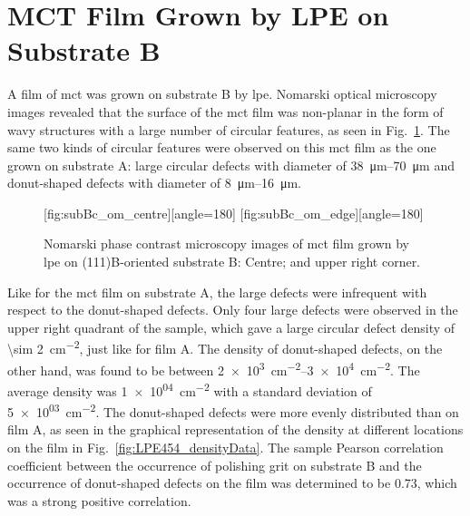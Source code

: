 \clearpage
\section{MCT Film Grown by LPE on Substrate B}\label{sec:subBc}

A film of \ac{mct} was grown on substrate B by \ac{lpe}. Nomarski optical microscopy images revealed that the surface of the \ac{mct} film was non-planar in the form of wavy structures with a large number of circular features, as seen in Fig.~\ref{fig:subBc_om}. The same two kinds of circular features were observed on this \ac{mct} film as the one grown on substrate A: large circular defects with diameter of \SIrange{38}{70}{\micro\metre} and donut-shaped defects with diameter of \SIrange{8}{16}{\micro\metre}.

\begin{figure}[htbp]
    \centering
    [fig:subBc_om_centre][angle=180]
    \hfill
    [fig:subBc_om_edge][angle=180]
    \caption[Nomarski phase contrast microscopy images of \ac{mct} film grown by \ac{lpe} on substrate B.]{Nomarski phase contrast microscopy images of \ac{mct} film grown by \ac{lpe} on (111)B-oriented substrate B:  Centre; and  upper right corner.}
    \label{fig:subBc_om}
\end{figure}


Like for the \ac{mct} film on substrate A, the large defects were infrequent with respect to the donut-shaped defects. Only four large defects were observed in the upper right quadrant of the sample, which gave a large circular defect density of \SI{\sim 2}{\centi\metre^{-2}}, just like for film A. The density of donut-shaped defects, on the other hand, was found to be between \SIrange{2e+3}{3e+4}{\centi\metre^{-2}}. The average density was \SI{1e+04}{\centi\metre^{-2}} with a standard deviation of \SI{5e+03}{\centi\metre^{-2}}. The donut-shaped defects were more evenly distributed than on film A, as seen in the graphical representation of the density at different locations on the film in Fig.~\ref{fig:LPE454_densityData}. The sample Pearson correlation coefficient between the occurrence of polishing grit on substrate B and the occurrence of donut-shaped defects on the film was determined to be \SI{+0.73}{}, which was a strong positive correlation. 

